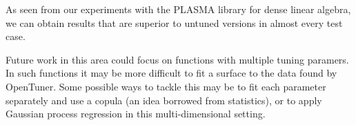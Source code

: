 \documentclass[a4paper,12pt]{article}
\begin{document}
As seen from our experiments with the PLASMA library
for dense linear algebra,
we can obtain results that are superior to untuned versions
in almost every test case.

Future work in this area could focus on functions with multiple
tuning paramers.
In such functions it may be more difficult
to fit a surface to the data found by OpenTuner.
Some possible ways to tackle this may be to fit
each parameter separately and use a copula
(an idea borrowed from statistics),
or to apply Gaussian process regression in this
multi-dimensional setting.




\end{document}
